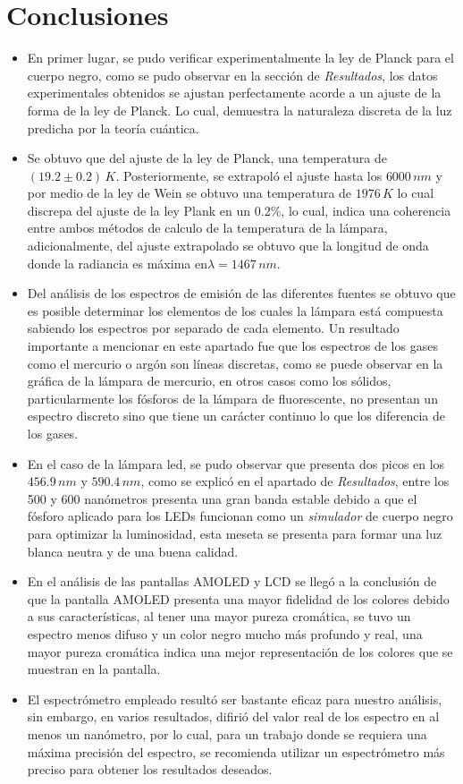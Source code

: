 \documentclass[twocolumn]{article}
\begin{document}
\section{Conclusiones}
\begin{itemize}
    \item En primer lugar, se pudo verificar experimentalmente la ley de Planck para el cuerpo negro, como se pudo observar en la sección de \textit{Resultados}, los datos experimentales obtenidos se ajustan perfectamente acorde a un ajuste de la forma de la ley de Planck. Lo cual, demuestra la naturaleza discreta de la luz predicha por la teoría cuántica.
    \item Se obtuvo que del ajuste de la ley de Planck, una temperatura de $(19.2\pm0.2)\,K$. Posteriormente, se extrapoló el ajuste hasta los $6000\,nm$ y por medio de la ley de Wein se obtuvo una temperatura de $1976\,K$ lo cual discrepa del ajuste de la ley Plank en un $0.2 \%$, lo cual, indica una coherencia entre ambos métodos de calculo de la temperatura de la lámpara, adicionalmente, del ajuste extrapolado se obtuvo que la longitud de onda donde la radiancia es máxima en$\lambda=1467\,nm$.
    \item Del análisis de los espectros de emisión de las diferentes fuentes se obtuvo que es posible determinar los elementos de los cuales la lámpara está compuesta sabiendo los espectros por separado de cada elemento. Un resultado importante a mencionar en este apartado fue que los espectros de los gases como el mercurio o argón son líneas discretas, como se puede observar en la gráfica de la lámpara de mercurio, en otros casos como los sólidos, particularmente los fósforos de la lámpara de fluorescente, no presentan un espectro discreto sino que tiene un carácter continuo lo que los diferencia de los gases.
    \item En el caso de la lámpara led, se pudo observar que presenta dos picos en los $456.9\,nm$ y $590.4\,nm$, como se explicó en el apartado de \textit{Resultados}, entre los 500 y 600 nanómetros presenta una gran banda estable debido a que el fósforo aplicado para los LEDs funcionan como un \textit{simulador} de cuerpo negro para optimizar la luminosidad, esta meseta se presenta para formar una luz blanca neutra y de una buena calidad.
    \item En el análisis de las pantallas AMOLED y LCD se llegó a la conclusión de que la pantalla AMOLED presenta una mayor fidelidad de los colores debido a sus características, al tener una mayor pureza cromática, se tuvo un espectro menos difuso y un color negro mucho más profundo y real, una mayor pureza cromática indica una mejor representación de los colores que se muestran en la pantalla.
    \item El espectrómetro empleado resultó ser bastante eficaz para nuestro análisis, sin embargo, en varios resultados, difirió del valor real de los espectro en al menos un nanómetro, por lo cual, para un trabajo donde se requiera una máxima precisión del espectro, se recomienda utilizar un espectrómetro más preciso para obtener los resultados deseados.
\end{itemize}
\end{document}
